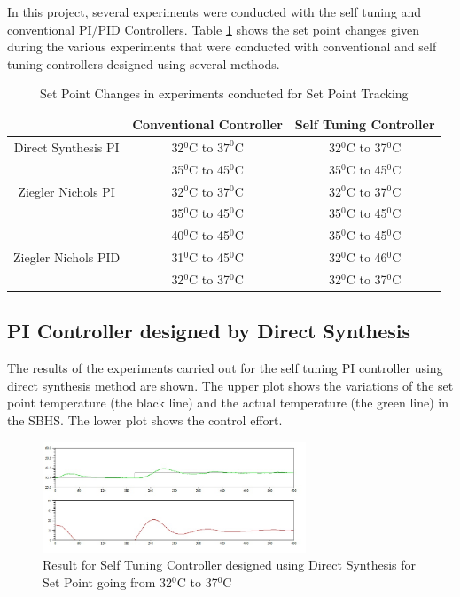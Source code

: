 In this project, several experiments were conducted with the self tuning and conventional PI/PID Controllers. Table \ref{spt} shows the set point changes given during the various experiments that were conducted with conventional and self tuning controllers designed using several methods.
\begin{table}[h]
	\centering
		\begin{tabular}{||c|c|c|}\hline
			&Conventional Controller&Self Tuning Controller\\\hline \hline
		Direct Synthesis PI&32$^0$C to $37^0$C&32$^0$C to 37$^0$C\\
											 &35$^0$C to 45$^0$C&35$^0$C to 45$^0$C\\\hline
		Ziegler Nichols PI&32$^0$C to 37$^0$C&32$^0$C to 37$^0$C\\
												&35$^0$C to 45$^0$C&35$^0$C to 45$^0$C\\
												&40$^0$C to 45$^0$C&35$^0$C to 45$^0$C\\\hline
		Ziegler Nichols PID&31$^0$C to 45$^0$C&32$^0$C to 46$^0$C\\
												&32$^0$C to 37$^0$C&32$^0$C to 37$^0$C\\\hline
		\end{tabular}
	\caption{Set Point Changes in experiments conducted for Set Point Tracking}
	\label{spt}
\end{table}
\newpage
\subsection{PI Controller designed by Direct Synthesis}
The results of the experiments carried out for the self tuning PI controller using direct synthesis method are shown. The upper plot shows the variations of the set point temperature (the black line) and the actual temperature (the green line) in the SBHS. The lower plot shows the control effort.
\begin{figure}[h]
	\centering
\includegraphics[width=0.7\textwidth]{Vikas_self/report_tex/PID_results/self_tuning/NewSetpoint_change/DirectSynthesis/step32to37.jpg}
	\caption{Result for Self Tuning Controller designed using Direct Synthesis for Set Point going from 32$^0$C to 37$^0$C}
	\label{fig:step32to37}
\end{figure}

